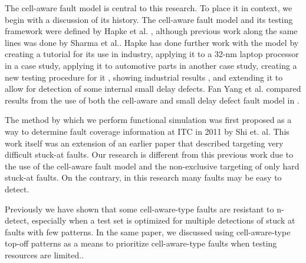 The cell-aware fault model is central to this research. 
To place it in context, we begin with a discussion of its history. 
The cell-aware fault model and its testing framework were defined by Hapke et al. \cite{5355741}, although previous work along the same lines was done by Sharma et al.\cite{4437604}. 
Hapke has done further work with the model by creating a tutorial for its use in industry\cite{Hapke}, applying it to a 32-nm laptop processor in a case study\cite{6401533},  applying it to automotive parts in another case study\cite{6847814}, creating a new testing procedure for it \cite{6879635}, showing industrial results \cite{5783604}, and extending it to allow for detection of some internal small delay defects\cite{6139151}. 
Fan Yang et al. compared results from the use of both the cell-aware and small delay defect fault model in \cite{6979084}.

The method by which we perform functional simulation was first proposed as a way to determine fault coverage information at ITC in 2011 by Shi et. al\cite{6139146}. 
This work itself was an extension of an earlier paper that described targeting very difficult stuck-at faults\cite{4700614}. 
Our research is different from this previous work due to the use of the cell-aware fault model and the non-exclusive targeting of only hard stuck-at faults.
On the contrary, in this research many faults may be easy to detect.

 Previously we have shown that some cell-aware-type faults are resistant to n-detect, especially when a test set is optimized for multiple detections of stuck at faults with few patterns. 
 In the same paper, we discussed using cell-aware-type top-off patterns as a means to prioritize cell-aware-type faults when testing resources are limited.\cite{6875445}. 

